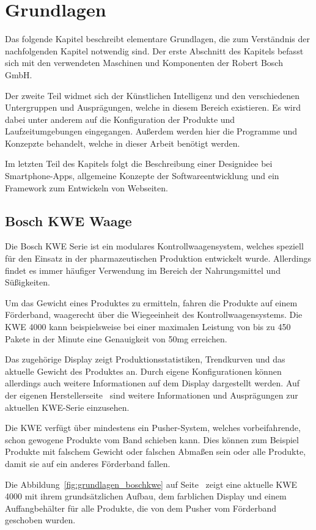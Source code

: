 \chapter{Grundlagen}
\label{ch:grundlagen}
Das folgende Kapitel beschreibt elementare Grundlagen, die zum Verständnis der nachfolgenden Kapitel notwendig sind. Der
erste Abschnitt des Kapitels befasst sich mit den verwendeten Maschinen und Komponenten der Robert Bosch GmbH.

Der zweite Teil widmet sich der Künstlichen Intelligenz und den verschiedenen Untergruppen und Ausprägungen, welche in
diesem Bereich existieren. Es wird dabei unter anderem auf die Konfiguration der Produkte und Laufzeitumgebungen
eingegangen. Außerdem werden hier die Programme und Konzepzte behandelt, welche in dieser Arbeit benötigt werden.

Im letzten Teil des Kapitels folgt die Beschreibung einer Designidee bei Smartphone-Apps, allgemeine Konzepte der
Softwareentwicklung und ein Framework zum Entwickeln von Webseiten.

\section{Bosch KWE Waage}
Die Bosch KWE Serie ist ein modulares Kontrollwaagensystem, welches speziell für den Einsatz in der pharmazeutischen
Produktion entwickelt wurde. Allerdings findet es immer häufiger Verwendung im Bereich der Nahrungsmittel und
Süßigkeiten.

Um das Gewicht eines Produktes zu ermitteln, fahren die Produkte auf einem Förderband, waagerecht über die Wiegeeinheit
des Kontrollwaagensystems. Die KWE 4000 kann beispielsweise bei einer maximalen Leistung von bis zu 450 Pakete in der
Minute eine Genauigkeit von 50mg erreichen.

Das zugehörige Display zeigt Produktionsstatistiken, Trendkurven und das aktuelle Gewicht des Produktes an. Durch eigene
Konfigurationen können allerdings auch weitere Informationen auf dem Display dargestellt werden. Auf der eigenen
Herstellerseite~\cite{online_grundlagen_boschkwe} sind weitere Informationen und Ausprägungen zur aktuellen KWE-Serie
einzusehen.

Die KWE verfügt über mindestens ein Pusher-System, welches vorbeifahrende, schon gewogene Produkte vom Band schieben
kann. Dies können zum Beispiel Produkte mit falschem Gewicht oder falschen Abmaßen sein oder alle Produkte, damit sie
auf ein anderes Förderband fallen.

Die Abbildung~\ref{fig:grundlagen_boschkwe} auf Seite~\pageref{fig:grundlagen_boschkwe} zeigt eine aktuelle KWE 4000 mit
ihrem grundsätzlichen Aufbau, dem farblichen Display und einem Auffangbehälter für alle Produkte, die von dem Pusher vom
Förderband geschoben wurden.

